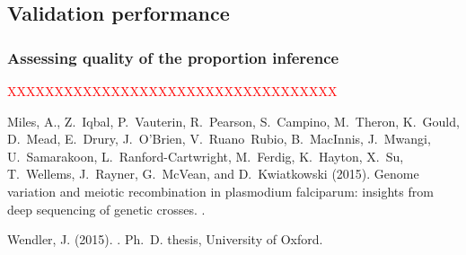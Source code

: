 \subsection{Validation performance}

\subsubsection{Assessing quality of the proportion inference}
\textcolor{red}{XXXXXXXXXXXXXXXXXXXXXXXXXXXXXXXXXXX}










\begin{thebibliography}{}


Miles, A., Z.~Iqbal, P.~Vauterin, R.~Pearson, S.~Campino, M.~Theron, K.~Gould,
  D.~Mead, E.~Drury, J.~O{\textquoteright}Brien, V.~Ruano~Rubio, B.~MacInnis,
  J.~Mwangi, U.~Samarakoon, L.~Ranford-Cartwright, M.~Ferdig, K.~Hayton, X.~Su,
  T.~Wellems, J.~Rayner, G.~McVean, and D.~Kwiatkowski (2015).
\newblock Genome variation and meiotic recombination in plasmodium falciparum:
  insights from deep sequencing of genetic crosses.
.

Wendler, J. (2015).
.
\newblock Ph.\ D. thesis, University of Oxford.

\end{thebibliography}

